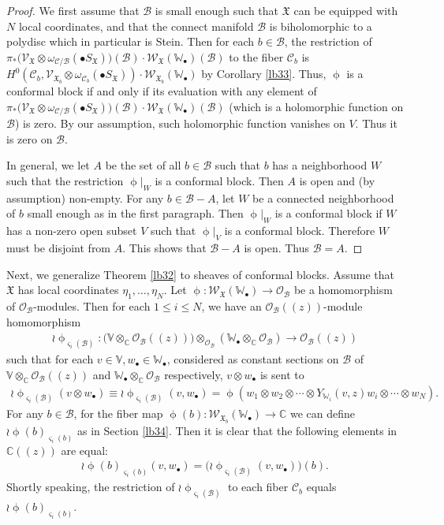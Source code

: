 \documentclass[12pt,b5paper,notitlepage]{report}
\theoremstyle{definition}
\theoremstyle{plain}
\newcommand{\fk}{\mathfrak}
\newcommand{\mc}{\mathcal}
\newcommand{\scr}{\mathscr}
\newcommand{\sgm}{\varsigma}
\newcommand{\blt}{\bullet}
\newcommand{\Vbb}{\mathbb V}
\newcommand{\Wbb}{\mathbb W}
\newcommand{\Cbb}{\mathbb C}
\numberwithin{equation}{section}
\begin{document}
\begin{proof}
We first assume that $\mc B$ is small enough such that $\fk X$ can be equipped with $N$ local coordinates,  and that the connect manifold $\mc B$ is biholomorphic to a polydisc which in particular is Stein. Then for each $b\in\mc B$, the restriction of $\pi_*\big(\scr V_{\fk X}\otimes\omega_{\mc C/\mc B}(\blt S_{\fk X})\big)(\mc B)\cdot \scr W_{\fk X}(\Wbb_\blt)(\mc B)$ to the fiber $\mc C_b$ is $H^0(\mc C_b,\scr V_{\fk X_b}\otimes\omega_{\mc C_b}(\blt S_{\fk X}))\cdot \scr W_{\fk X_b}(\Wbb_\blt)$ by Corollary \ref{lb33}. Thus, $\upphi$ is a conformal block if and only if its evaluation with any element of $\pi_*\big(\scr V_{\fk X}\otimes\omega_{\mc C/\mc B}(\blt S_{\fk X})\big)(\mc B)\cdot \scr W_{\fk X}(\Wbb_\blt)(\mc B)$ (which is a holomorphic function on $\mc B$) is zero. By our assumption, such holomorphic function vanishes on $V$. Thus it is zero on $\mc B$.

In general, we let $A$ be the set of all $b\in\mc B$ such that $b$ has a neighborhood $W$ such that the restriction $\upphi|_W$ is a conformal block. Then $A$ is open and (by assumption) non-empty. For any $b\in\mc B-A$, let $W$ be a connected neighborhood of $b$ small enough as in the first paragraph. Then $\upphi|_W$ is a conformal block if $W$ has a non-zero open subset $V$ such that $\upphi|_V$ is a conformal block. Therefore $W$ must be disjoint from $A$. This shows that $\mc B-A$ is open. Thus $\mc B=A$.
\end{proof}




Next, we generalize Theorem \ref{lb32} to sheaves of conformal blocks. Assume that $\fk X$ has local coordinates $\eta_1,\dots,\eta_N$.  Let $\upphi:\scr W_{\fk X}(\Wbb_\blt)\rightarrow \scr O_{\mc B}$ be a homomorphism of $\scr O_{\mc B}$-modules. Then for each $1\leq i\leq N$, we have an $\scr O_{\mc B}((z))$-module homomorphism
\begin{gather*}
\wr\upphi_{\sgm_i(\mc B)}:\big(\Vbb\otimes_\Cbb\scr O_{\mc B}((z))\big)\otimes_{\scr O_{\mc B}} (\Wbb_\blt\otimes_\Cbb\scr O_{\mc B})\rightarrow \scr O_{\mc B}((z))
\end{gather*}
such that for each $v\in\Vbb,w_\blt\in\Wbb_\blt$, considered as constant sections on $\mc B$ of  $\Vbb\otimes_\Cbb\scr O_{\mc B}((z))$ and $\Wbb_\blt\otimes_\Cbb\scr O_{\mc B}$ respectively, $v\otimes w_\blt$ is sent to
\begin{align}
\wr\upphi_{\sgm_i(\mc B)}(v\otimes w_\blt)\equiv\wr\upphi_{\sgm_i(\mc B)}(v,w_\blt)=\upphi(w_1\otimes w_2\otimes\cdots\otimes Y_{\Wbb_i}(v,z)w_i\otimes\cdots\otimes w_N).
\end{align}
For any $b\in\mc B$, for the fiber map $\upphi(b):\scr W_{\fk X_b}(\Wbb_\blt)\rightarrow\Cbb$ we can define $\wr\upphi(b)_{\sgm_i(b)}$ as in Section \ref{lb34}. Then it is clear that the following elements in $\Cbb((z))$ are equal:
\begin{align}
\wr\upphi(b)_{\sgm_i(b)}(v,w_\blt)=\big(\wr\upphi_{\sgm_i(\mc B)}(v,w_\blt)\big)(b).\label{eq100}
\end{align}
Shortly speaking, the restriction of $\wr\upphi_{\sgm_i(\mc B)}$ to each fiber $\mc C_b$ equals $\wr\upphi(b)_{\sgm_i(b)}$.
\end{document}
